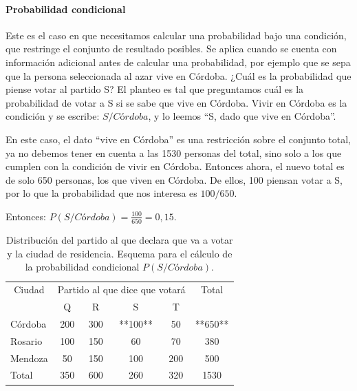\documentclass[]{article}
\let\oldparagraph\paragraph
\renewcommand{\paragraph}[1]{\oldparagraph{#1}\mbox{}}
\begin{document}
\hypertarget{probabilidad-condicional}{%
\paragraph{Probabilidad condicional}\label{probabilidad-condicional}}

Este es el caso en que necesitamos calcular una probabilidad bajo una
condición, que restringe el conjunto de resultado posibles. Se aplica
cuando se cuenta con información adicional antes de calcular una
probabilidad, por ejemplo que se sepa que la persona seleccionada al
azar vive en Córdoba. ¿Cuál es la probabilidad que piense votar al
partido S? El planteo es tal que preguntamos cuál es la probabilidad de
votar a S si se sabe que vive en Córdoba. Vivir en Córdoba es la
condición y se escribe: \(S/Córdoba\), y lo leemos ``S, dado que vive en
Córdoba''.

En este caso, el dato ``vive en Córdoba'' es una restricción sobre el
conjunto total, ya no debemos tener en cuenta a las 1530 personas del
total, sino solo a los que cumplen con la condición de vivir en Córdoba.
Entonces ahora, el nuevo total es de solo 650 personas, los que viven en
Córdoba. De ellos, 100 piensan votar a S, por lo que la probabilidad que
nos interesa es \(100/650\).

Entonces: \(P(S/Córdoba) = \frac{100}{650} = 0,15\).

\begin{table}

\caption{\label{tab:unnamed-chunk-22}Distribución del partido al que declara que va a votar y la ciudad de residencia. Esquema para el cálculo de la probabilidad condicional $P(S/Córdoba)$.}
\centering
\begin{tabular}[t]{lccccc}
\toprule
\multicolumn{1}{c}{Ciudad} & \multicolumn{4}{c}{Partido al que dice que votará} & \multicolumn{1}{c}{Total} \\
\cmidrule(l{3pt}r{3pt}){1-1} \cmidrule(l{3pt}r{3pt}){2-5} \cmidrule(l{3pt}r{3pt}){6-6}
 & Q & R & S & T & \\
\midrule
\rowcolor{gray!6}  Córdoba & 200 & 300 & **100** & 50 & **650**\\
Rosario & 100 & 150 & 60 & 70 & 380\\
\rowcolor{gray!6}  Mendoza & 50 & 150 & 100 & 200 & 500\\
Total & 350 & 600 & 260 & 320 & 1530\\
\bottomrule
\end{tabular}
\end{table}
\end{document}
